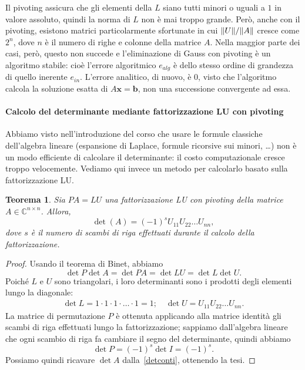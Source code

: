 \documentclass[a4paper]{report}
\DeclarePairedDelimiter{\norm}{\lVert}{\rVert}
\newtheorem{theorem}{Teorema}[chapter]
\theoremstyle{definition}
\theoremstyle{remark}
\newcommand{\x}{\mathbf{x}}
\renewcommand{\b}{\mathbf{b}}
\begin{document}
Il pivoting assicura che gli elementi della $L$ siano tutti minori o uguali a $1$ in valore assoluto, quindi la norma di $L$ non è mai troppo grande. Però, anche con il pivoting, esistono matrici particolarmente sfortunate in cui $\norm{U}/\norm{A}$ cresce come $2^n$, dove $n$ è il numero di righe e colonne della matrice $A$. Nella maggior parte dei casi, però, questo non succede e l'eliminazione di Gauss con pivoting è un algoritmo stabile: cioè l'errore algoritmico $e_{alg}$ è dello stesso ordine di grandezza di quello inerente $e_{in}$. L'errore analitico, di nuovo, è $0$, visto che l'algoritmo calcola la soluzione esatta di $A\x=\b$, non una successione convergente ad essa.

\paragraph{Calcolo del determinante mediante fattorizzazione LU con pivoting} Abbiamo visto nell'introduzione del corso che usare le formule classiche dell'algebra lineare (espansione di Laplace, formule ricorsive sui minori, \dots) non è un modo efficiente di calcolare il determinante: il costo computazionale cresce troppo velocemente. Vediamo qui invece un metodo per calcolarlo basato sulla fattorizzazione LU.

\begin{theorem}
Sia $PA = LU$ una fattorizzazione LU con pivoting della matrice $A \in \mathbb{C}^{n \times n}$. Allora,
\[
\det(A) = (-1)^s U_{11} U_{22} \dots U_{nn},
\]
dove $s$ è il numero di scambi di riga effettuati durante il calcolo della fattorizzazione.
\end{theorem}
\begin{proof}
Usando il teorema di Binet, abbiamo
\begin{equation} \label{detconti}
    \det P \det A = \det PA = \det LU = \det L \det U.    
\end{equation}
Poiché $L$ e $U$ sono triangolari, i loro determinanti sono i prodotti degli elementi lungo la diagonale:
\begin{align*}
\det L = 1 \cdot 1 \cdot 1 \cdot \dots \cdot 1 = 1; \quad
\det U = U_{11} U_{22} \dots U_{nn}.
\end{align*}
La matrice di permutazione $P$ è ottenuta applicando alla matrice identità gli scambi di riga effettuati lungo la fattorizzazione; sappiamo dall'algebra lineare che ogni scambio di riga fa cambiare il segno del determinante, quindi abbiamo
\[
\det P = (-1)^s \det I = (-1)^s.
\]
Possiamo quindi ricavare $\det A$ dalla~\eqref{detconti}, ottenendo la tesi.
\end{proof}
\end{document}
